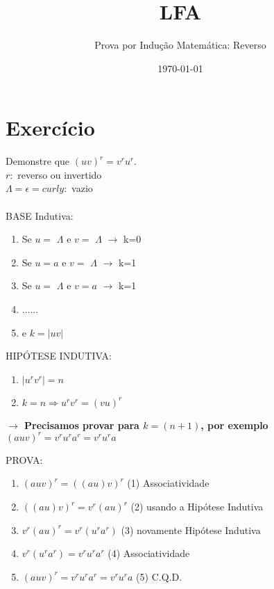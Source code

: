 \documentclass[a4paper,12pt]{article}
\title{LFA}
\author{Prova por Indução Matemática: Reverso }
\date{\today}
\begin{document}
\maketitle

\section{Exercício}

 Demonstre que $(uv)^r=v^ru^r$.\\
	$r:$ reverso ou invertido\\
	$\Lambda=\epsilon = curly:$ vazio\\\\
	
	
	BASE Indutiva:
	\begin{enumerate}
		
	
		\item Se $u=$ $\Lambda$ e $v=$ $\Lambda$ $\rightarrow$ k=0
		\item Se $u=a$ e $v=$ $\Lambda$ $\rightarrow$ k=1
		\item Se $u=$ $\Lambda$ e $v=a$ $\rightarrow$ k=1
		\item ...... 
		\item e $k=|uv|$\\ 
		
	
		
			
	\end{enumerate}
	
	HIPÓTESE INDUTIVA:
	\begin{enumerate}
	    \item $\mid u^rv^r \mid = n$
		\item 	$k=n \Rightarrow u^rv^r = (vu)^r$\\
		

		\end{enumerate}
			\textbf{$\rightarrow$ Precisamos provar para $k=(n+1)$, por exemplo $(auv)^r=v^ru^ra^r=v^ru^ra$}  
	
	PROVA:
	\begin{enumerate}

		
		 \item$(auv)^r=((au)v)^r$ \hspace{2cm} (1) Associatividade
		 
		 \item$((au)v)^r=v^r(au)^r$ \hspace{2cm}  (2) usando a Hipótese Indutiva
		 
		 \item$v^r(au)^r=v^r(u^ra^r)$ \hspace{2cm}  (3) novamente Hipótese Indutiva
		 
		 \item$v^r(u^ra^r)=v^ru^ra^r$ \hspace{2cm}  (4) Associatividade\\
		
		 
		 \item$(auv)^r=v^ru^ra^r=v^ru^ra$\hspace{2cm} 	 (5) C.Q.D.

	
	
\end{enumerate}



	
\end{document}
